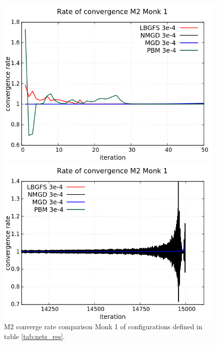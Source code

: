 \begin{figure}[H]
	\centering
	\begin{minipage}[t]{0.525\linewidth}		
		\includegraphics[width=\linewidth]{data/Comparison/Monk1/Monk1_M2_CR_zoomLeft.png}
	\end{minipage}%
	\begin{minipage}[t]{0.525\linewidth}
		\includegraphics[width=\linewidth]{data/Comparison/Monk1/Monk1_M2_CR_zoomRight.png}
	\end{minipage}
	\caption{M2 converge rate comparison Monk 1 of configurations defined in table \ref{tab:nets_res}.}
	\label{fig:CR-M2-Monk1-Zoom}
\end{figure}

